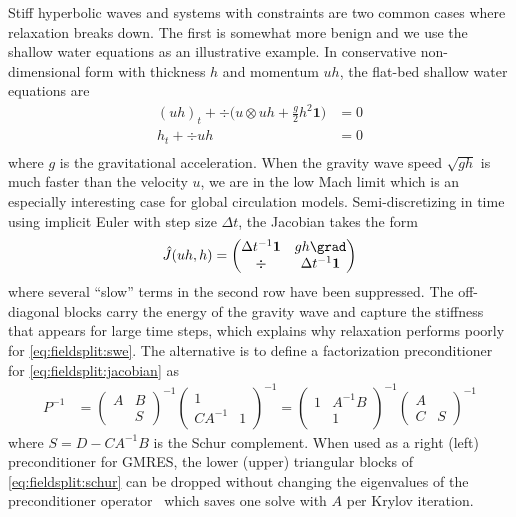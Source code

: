 Stiff hyperbolic waves and systems with constraints are two common cases where relaxation breaks down.
The first is somewhat more benign and we use the shallow water equations as an illustrative example.
In conservative non-dimensional form with thickness $h$ and momentum $uh$, the flat-bed shallow water equations are
\begin{align*}
  (uh)_t + \div \Big( u\otimes uh + \frac g 2 h^2 \bm 1 \Big) & = 0 \\
  h_t + \div uh & = 0 \\
\end{align*}
where $g$ is the gravitational acceleration.
When the gravity wave speed $\sqrt{gh}$ is much faster than the velocity $u$, we are in the low Mach limit which is an especially interesting case for global circulation models.
Semi-discretizing in time using implicit Euler with step size $\Delta t$, the Jacobian takes the form
\begin{align}\label{eq:fieldsplit:swe}
  \hat J(uh,h) =
  \begin{pmatrix}
    \Delta t^{-1} \bm 1 & g h \grad \\
    \div & \Delta t^{-1} \bm 1
  \end{pmatrix}
\end{align}
where several ``slow'' terms in the second row have been suppressed.
The off-diagonal blocks carry the energy of the gravity wave and capture the stiffness that appears for large time steps, which explains why relaxation performs poorly for \eqref{eq:fieldsplit:swe}.
The alternative is to define a factorization preconditioner for \eqref{eq:fieldsplit:jacobian} as
\begin{align}\label{eq:fieldsplit:schur}
  P^{-1} & =
  \begin{pmatrix} A & B \\ & S \end{pmatrix}^{-1}
  \begin{pmatrix} 1 & \\ CA^{-1} & 1 \end{pmatrix}^{-1}
  =
  \begin{pmatrix} 1 & A^{-1} B \\  & 1 \end{pmatrix}^{-1}
  \begin{pmatrix} A & \\ C & S \end{pmatrix}^{-1}
\end{align}
where $S = D - C A^{-1} B$ is the Schur complement.
When used as a right (left) preconditioner for GMRES, the lower (upper) triangular blocks of \eqref{eq:fieldsplit:schur} can be dropped without changing the eigenvalues of the preconditioner operator~\citep{murphy2000npi,ipsen2001note} which saves one solve with $A$ per Krylov iteration.
